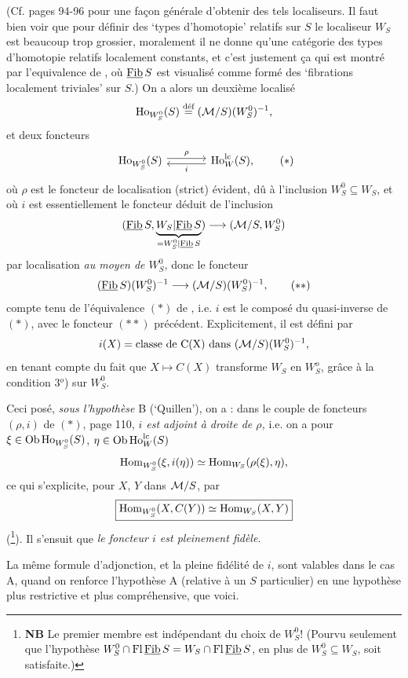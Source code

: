 (Cf. pages 94-96 pour une façon générale d'obtenir des tels localiseurs. Il faut bien voir que pour définir des ‘types d'homotopie’ relatifs sur $S$ le localiseur $W_S$ est beaucoup trop grossier, moralement il ne donne qu'une catégorie des types d'homotopie relatifs localement constants, et c'est justement ça qui est montré par l'equivalence de  , où $\underline{\mathrm{Fib}}\, S$ est visualisé comme formé des ‘fibrations localement triviales’ sur $S$.) On a alors un deuxième localisé %
\[\mathrm{Ho}_{W_S^0}(S) \overset{\text{déf}}{=} (\mathcal{M}/S)(W_S^0)^{-1},\]
et deux foncteurs
\[
\begin{tikzcd}[column sep=large]
\Ho_{W_S^0}(S) \arrow[r, shift left, "\rho"] & \Ho^{\mathrm{lc}}_W(S), \arrow[l, shift left, "i"]
\end{tikzcd}
\tag*{$(*)$}
\]
où $\rho$ est le foncteur de localisation (strict) évident, dû à l'inclusion $W_S^0 \subseteq W_S$, et où $i$ est
essentiellement le foncteur déduit de l'inclusion
\[(\underline{\mathrm{Fib}}\, S, \underbrace{W_S|\underline{\mathrm{Fib}}\, S}_{=W_S^0|\underline{\mathrm{Fib}}\, S}) \longrightarrow (\mathcal{M}/S, W_S^0)\]
par localisation \textit{au moyen de $W_S^0$}, donc le foncteur
\[(\Fib S)(W_S^0)^{-1} \longrightarrow (\M/S)(W_S^0)^{-1}, \tag*{$(**)$}\]
compte tenu de l'équivalence $(*)$ de  , i.e. $i$ est le composé du quasi-inverse de $(*)$, avec le foncteur $(**)$ précédent. Explicitement, il est défini par
\[i(X) = \text{classe de C(X) dans } (\mathcal{M}/S)(W_S^0)^{-1},\]
en tenant compte du fait que $X \longmapsto C(X)$ transforme $W_S$ en $W_S^o$, grâce à la condition 3$^o$) sur $W_S^0$. %

Ceci posé, \textit{sous l'hypothèse} B (‘Quillen’), on a : dans le couple de foncteurs $(\rho, i)$ de $(*)$, page 110, \textit{$i$ est adjoint à droite de $\rho$,} i.e. on a pour $\xi \in \mathrm{Ob}\,\mathrm{Ho}_{W_S^0}(S)$, $\eta \in \mathrm{Ob}\,\mathrm{Ho}^{\mathrm{lc}}_W(S)$
\[\operatorname{Hom}_{W_S^0}(\xi, i(\eta)) \simeq \operatorname{Hom}_{W_S}(\rho(\xi), \eta),\]
ce qui s'explicite, pour $X$, $Y$ dans $\mathcal{M}/S$, par
\[\boxed{\operatorname{Hom}_{W_S^0}(X, C(Y)) \simeq \operatorname{Hom}_{W_S}(X, Y)}\]
(\footnote{\textbf{NB} Le premier membre est indépendant du choix de $W_S^0$! (Pourvu seulement que l'hypothèse $W_S^0 \cap \mathrm{Fl}\,\underline{\mathrm{Fib}}\, S = W_S \cap \mathrm{Fl}\,\underline{\mathrm{Fib}}\, S$, en plus de $W_S^0 \subseteq W_S$, soit satisfaite.)}). Il s'ensuit que \textit{le foncteur $i$ est pleinement fidèle.}

La même formule d'adjonction, et la
pleine fidélité de $i$, sont valables dans le cas A, quand on renforce l'hypothèse A (relative à un $S$ particulier) en une hypothèse plus restrictive et plus compréhensive, que voici.

